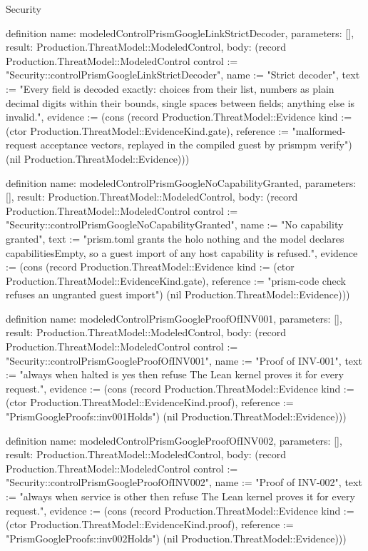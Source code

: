 \begin{lexlean}{Security}
\begin{semanticmodule}
definition{
  name: modeledControlPrismGoogleLinkStrictDecoder,
  parameters: [],
  result: Production.ThreatModel::ModeledControl,
  body: (record Production.ThreatModel::ModeledControl {control := "Security::controlPrismGoogleLinkStrictDecoder", name := "Strict decoder", text := "Every field is decoded exactly: choices from their list, numbers as plain decimal digits within their bounds, single spaces between fields; anything else is invalid.", evidence := (cons (record Production.ThreatModel::Evidence {kind := (ctor Production.ThreatModel::EvidenceKind.gate), reference := "malformed-request acceptance vectors, replayed in the compiled guest by prismpm verify"}) (nil Production.ThreatModel::Evidence))})
}

definition{
  name: modeledControlPrismGoogleNoCapabilityGranted,
  parameters: [],
  result: Production.ThreatModel::ModeledControl,
  body: (record Production.ThreatModel::ModeledControl {control := "Security::controlPrismGoogleNoCapabilityGranted", name := "No capability granted", text := "prism.toml grants the holo nothing and the model declares capabilitiesEmpty, so a guest import of any host capability is refused.", evidence := (cons (record Production.ThreatModel::Evidence {kind := (ctor Production.ThreatModel::EvidenceKind.gate), reference := "prism-code check refuses an ungranted guest import"}) (nil Production.ThreatModel::Evidence))})
}

definition{
  name: modeledControlPrismGoogleProofOfINV001,
  parameters: [],
  result: Production.ThreatModel::ModeledControl,
  body: (record Production.ThreatModel::ModeledControl {control := "Security::controlPrismGoogleProofOfINV001", name := "Proof of INV-001", text := "always when halted is yes then refuse The Lean kernel proves it for every request.", evidence := (cons (record Production.ThreatModel::Evidence {kind := (ctor Production.ThreatModel::EvidenceKind.proof), reference := "PrismGoogleProofs::inv001Holds"}) (nil Production.ThreatModel::Evidence))})
}

definition{
  name: modeledControlPrismGoogleProofOfINV002,
  parameters: [],
  result: Production.ThreatModel::ModeledControl,
  body: (record Production.ThreatModel::ModeledControl {control := "Security::controlPrismGoogleProofOfINV002", name := "Proof of INV-002", text := "always when service is other then refuse The Lean kernel proves it for every request.", evidence := (cons (record Production.ThreatModel::Evidence {kind := (ctor Production.ThreatModel::EvidenceKind.proof), reference := "PrismGoogleProofs::inv002Holds"}) (nil Production.ThreatModel::Evidence))})
}


\end{semanticmodule}
\end{lexlean}
